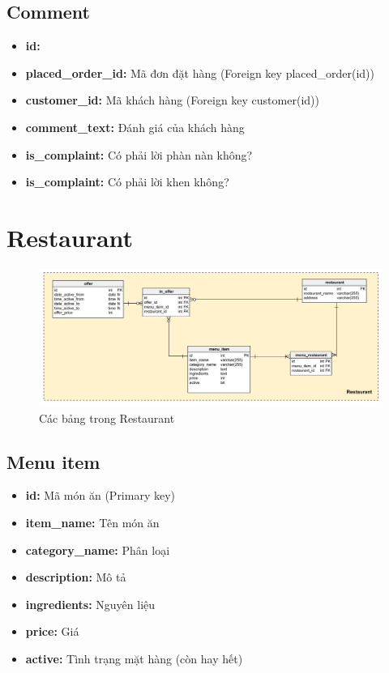 \documentclass[a4paper,12pt]{article}
\begin{document}
\subsection{Comment}
\begin{itemize}
	\item \textbf{id:}
	\item \textbf{placed\_order\_id:} Mã đơn đặt hàng (Foreign key placed\_order(id))
	\item \textbf{customer\_id:} Mã khách hàng (Foreign key customer(id))
	\item \textbf{comment\_text:} Đánh giá của khách hàng
	\item \textbf{is\_complaint:} Có phải lời phàn nàn không?
	\item \textbf{is\_complaint:} Có phải lời khen không?
\end{itemize}
\clearpage
\section{Restaurant}
\begin{figure}[ht!]
	\centerline{\includegraphics[width=1\textwidth]{restaurant.png}}
	\label{fig:ass1}
	\caption{Các bảng trong Restaurant}
\end{figure}
\subsection{Menu item}
\begin{itemize}
	\item \textbf{id:} Mã món ăn (Primary key)
	\item \textbf{item\_name:} Tên món ăn
	\item \textbf{category\_name:} Phân loại
	\item \textbf{description:} Mô tả
	\item \textbf{ingredients:} Nguyên liệu
	\item \textbf{price:} Giá
	\item \textbf{active:} Tình trạng mặt hàng (còn hay hết)
\end{itemize}
\end{document}
